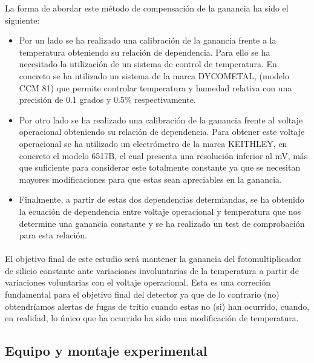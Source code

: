 \documentclass[11pt, a4paper]{article}
\begin{document}

La forma de abordar este método de compensación de la ganancia ha sido el siguiente:
\begin{itemize}
\item {} 
Por un lado se ha realizado una calibración de la ganancia frente a la temperatura obteniendo su relación de dependencia. Para ello se ha necesitado la utilización de un sistema de control de temperatura. En concreto se ha utilizado un sistema de la marca DYCOMETAL, (modelo CCM 81) que permite controlar temperatura y humedad relativa con una precisión de 0.1 grados y  0.5\% respectivamente.

\item {} Por otro lado se ha realizado una calibración de la ganancia frente al voltaje operacional obteniendo su relación de dependencia. Para obtener este voltaje operacional se ha utilizado un electrómetro de la marca KEITHLEY, en concreto el modelo 6517B, el cual presenta una resolución inferior al mV, más que suficiente para considerar este totalmente constante ya que se necesitan mayores modificaciones para que estas sean apreciables en la ganancia.

\item {} Finalmente, a partir de estas dos dependencias determiandas, se ha obtenido la ecuación de dependencia entre voltaje operacional y temperatura que nos determine una ganancia constante  y se ha realizado un test de comprobación para esta relación.
\end{itemize}

\paragraph {}
El objetivo final de este estudio será mantener la ganancia del fotomultiplicador de silicio constante ante variaciones involuntarias de la temperatura a partir de variaciones voluntarias con el voltaje operacional. Esta es una correción fundamental para el objetivo final del detector ya que de lo contrario (no) obtendríamos alertas de fugas de tritio cuando estas no (si) han ocurrido, cuando, en realidad, lo único que ha ocurrido ha sido una modificación de temperatura.

\newpage

\subsection {Equipo y montaje experimental} 
\end{document}
